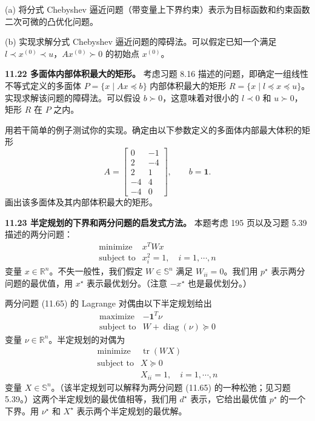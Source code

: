 \documentclass[UTF8, 12pt, fontset=fandol, oneside]{ctexart}
\begin{document}
(a) 将分式 Chebyshev 逼近问题（带变量上下界约束）表示为目标函数和约束函数二次可微的凸优化问题。

(b) 实现求解分式 Chebyshev 逼近问题的障碍法。可以假定已知一个满足 $l\prec x^{(0)}\prec u$，$Ax^{(0)}\succ 0$ 的初始点 $x^{(0)}$。

\noindent\textbf{11.22 多面体内部体积最大的矩形。} 考虑习题 8.16 描述的问题，即确定一组线性不等式定义的多面体 $P=\{x\mid Ax\preceq b\}$ 内部体积最大的矩形 $R=\{x\mid l\preceq x\preceq u\}$。实现求解该问题的障碍法。可以假设 $b\succ 0$，这意味着对很小的 $l\prec 0$ 和 $u\succ 0$，矩形 $R$ 在 $P$ 之内。

用若干简单的例子测试你的实现。确定由以下参数定义的多面体内部最大体积的矩形
\[
A=\begin{bmatrix}
0 & -1\\
2 & -4\\
2 & 1\\
-4 & 4\\
-4 & 0
\end{bmatrix},\qquad b=\mathbf{1}.
\]
画出该多面体及其内部体积最大的矩形。

\noindent\textbf{11.23 半定规划的下界和两分问题的启发式方法。} 本题考虑 195 页以及习题 5.39 描述的两分问题：
\begin{equation}
\begin{array}{ll}
\text{minimize} & x^TWx\\
\text{subject to} & x_i^2=1,\quad i=1,\cdots,n
\end{array}
\tag{11.65}
\end{equation}
变量 $x\in\mathbb{R}^n$。不失一般性，我们假定 $W\in\mathbb{S}^n$ 满足 $W_{ii}=0$。我们用 $p^\star$ 表示两分问题的最优值，用 $x^\star$ 表示最优划分。（注意 $-x^\star$ 也是最优划分。）

两分问题 (11.65) 的 Lagrange 对偶由以下半定规划给出
\begin{equation}
\begin{array}{ll}
\text{maximize} & -\mathbf{1}^T\nu\\
\text{subject to} & W+\operatorname{diag}(\nu)\succeq 0
\end{array}
\tag{11.66}
\end{equation}
变量 $\nu\in\mathbb{R}^n$。半定规划的对偶为
\begin{equation}
\begin{array}{ll}
\text{minimize} & \operatorname{tr}(WX)\\
\text{subject to} & X\succeq 0\\
& X_{ii}=1,\quad i=1,\cdots,n
\end{array}
\tag{11.67}
\end{equation}
变量 $X\in\mathbb{S}^n$。（该半定规划可以解释为两分问题 (11.65) 的一种松弛；见习题 5.39。）这两个半定规划的最优值相等，我们用 $d^\star$ 表示，它给出最优值 $p^\star$ 的一个下界。用 $\nu^\star$ 和 $X^\star$ 表示两个半定规划的最优解。
\end{document}
